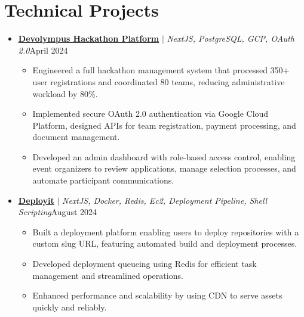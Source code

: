 \documentclass[letterpaper,11pt]{article}
\begin{document}
\section{Technical Projects}
\vspace{-1pt}
\begin{itemize}[leftmargin=*,itemsep=2pt,parsep=0pt,topsep=0pt,partopsep=0pt]

	\item \textbf{\href{[https://devolympus.deviatorsdce.tech}{Devolympus Hackathon Platform}} $|$ \emph{NextJS, PostgreSQL, GCP, OAuth 2.0}\hfill {April 2024}
	      \begin{itemize}[leftmargin=*,itemsep=1pt,parsep=0pt,topsep=0pt,partopsep=0pt]
		      \item Engineered a full hackathon management system that processed 350+ user registrations and coordinated 80 teams, reducing administrative workload by 80\%.
		      \item Implemented secure OAuth 2.0 authentication via Google Cloud Platform, designed APIs for team registration, payment processing, and document management.
		      \item Developed an admin dashboard with role-based access control, enabling event organizers to review applications, manage selection processes, and automate participant communications.
	      \end{itemize}

	\item \textbf{\href{https://deployit.live/}{Deployit}} $|$ \emph{NextJS, Docker, Redis, Ec2, Deployment Pipeline, Shell Scripting}\hfill {August 2024}
	      \begin{itemize}[leftmargin=*,itemsep=1pt,parsep=0pt,topsep=0pt,partopsep=0pt]
		      \item Built a deployment platform enabling users to deploy repositories with a custom
		            slug URL, featuring automated build and deployment processes.
		      \item Developed deployment queueing using Redis for efficient task management and
		            streamlined operations.
		      \item Enhanced performance and scalability by using CDN to serve assets quickly and
		            reliably.
	      \end{itemize}

\end{itemize}
\vspace{-8pt}
\end{document}
